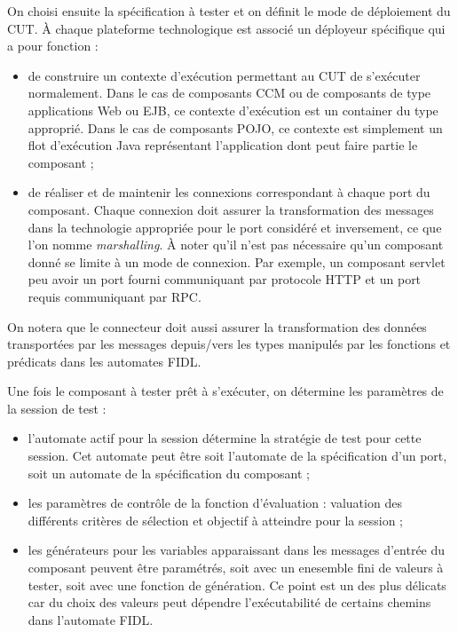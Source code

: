 On choisi ensuite la sp\'ecification \`a tester et on d\'efinit le
mode de d\'eploiement du CUT. \`A chaque plateforme technologique
est associ\'e un d\'eployeur sp\'ecifique qui a pour fonction :
\begin{itemize}
  \item de construire un contexte d'ex\'ecution permettant au CUT de
  s'ex\'ecuter normalement. Dans le cas de composants CCM ou de
  composants de type applications Web ou EJB, ce contexte
  d'ex\'ecution est un container du type appropri\'e. Dans le cas de
  composants POJO, ce contexte est simplement un flot d'ex\'ecution
  Java repr\'esentant l'application dont peut faire partie le
  composant ;
\item de r\'ealiser et de maintenir les connexions correspondant \`a
  chaque port du composant. Chaque connexion doit assurer la
  transformation des messages dans la technologie appropri\'ee pour
  le port consid\'er\'e et inversement, ce que l'on nomme
  \emph{marshalling}. \`A noter qu'il n'est pas n\'ecessaire qu'un
  composant donn\'e se limite \`a un mode de connexion. Par exemple,
  un composant servlet peu avoir un port fourni communiquant par
  protocole HTTP et un port requis communiquant par RPC. 
\end{itemize}
On notera que le connecteur doit aussi assurer la transformation des
donn\'ees transport\'ees par les messages depuis/vers les types
manipul\'es par les fonctions et pr\'edicats dans les automates
\textsf{FIDL}.

Une fois le composant \`a tester pr\^et \`a s'ex\'ecuter, on
d\'etermine les param\`etres de la session de test :
\begin{itemize}
  \item l'automate actif pour la session d\'etermine la strat\'egie
    de test pour cette session. Cet automate peut \^etre soit
    l'automate de la sp\'ecification d'un port, soit un automate de la
    sp\'ecification du composant ; 
  \item les param\`etres de contr\^ole de la fonction d'\'evaluation
    : valuation des diff\'erents crit\`eres de s\'election et
    objectif \`a atteindre pour la session ;
  \item les g\'en\'erateurs pour les variables apparaissant dans les
  messages d'entr\'ee du composant peuvent \^etre param\'etr\'es,
  soit avec un enesemble fini de valeurs \`a tester, soit avec une
  fonction de g\'en\'eration. Ce point est un des plus d\'elicats
  car du choix des valeurs peut d\'ependre l'ex\'ecutabilit\'e de
  certains chemins dans l'automate \textsf{FIDL}.
\end{itemize}

